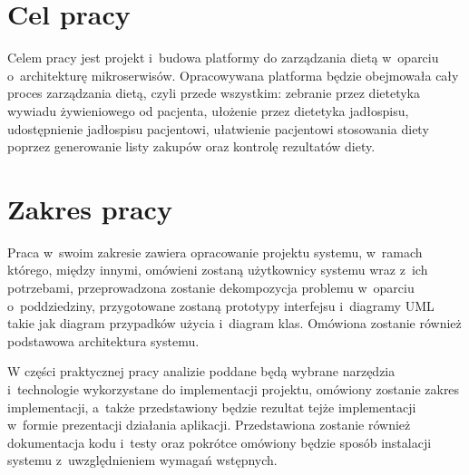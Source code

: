 \section*{Cel pracy}\label{sec:thesis-goal}

Celem pracy jest projekt i~budowa platformy do zarządzania dietą w~oparciu o~architekturę mikroserwisów.
Opracowywana platforma będzie obejmowała cały proces zarządzania dietą, czyli przede wszystkim:
zebranie przez dietetyka wywiadu żywieniowego od pacjenta,
ułożenie przez dietetyka jadłospisu,
udostępnienie jadłospisu pacjentowi,
ułatwienie pacjentowi stosowania diety poprzez generowanie listy zakupów
oraz kontrolę rezultatów diety.

\section*{Zakres pracy}\label{sec:scope-of-work}

Praca w~swoim zakresie zawiera opracowanie projektu systemu, w~ramach którego, między innymi,
omówieni zostaną użytkownicy systemu wraz z~ich potrzebami,
przeprowadzona zostanie dekompozycja problemu w~oparciu o~poddziedziny,
przygotowane zostaną prototypy interfejsu i~diagramy UML takie jak diagram przypadków użycia i~diagram klas.
Omówiona zostanie również podstawowa architektura systemu.
\par
W części praktycznej pracy analizie poddane będą wybrane narzędzia i~technologie wykorzystane do implementacji projektu,
omówiony zostanie zakres implementacji, a~także przedstawiony będzie rezultat tejże implementacji w~formie prezentacji działania aplikacji.
Przedstawiona zostanie również dokumentacja kodu i~testy oraz pokrótce omówiony będzie sposób instalacji systemu z~uwzględnieniem wymagań wstępnych.

\thispagestyle{normal}
